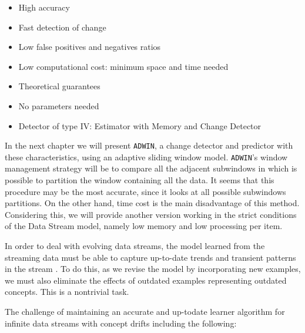 \begin{itemize}
\item High accuracy
\item Fast detection of change
\item Low false positives and negatives ratios 
\item Low computational cost: minimum space and time needed
\item Theoretical guarantees 
\item No parameters needed
\item Detector of type IV: Estimator with Memory and Change Detector
\end{itemize}

In the next chapter we will present %
{\tt ADWIN}, %
a change detector and predictor 
with these characteristics, using an adaptive sliding window model.  %
{\tt ADWIN}'s window management strategy will be to compare all the adjacent subwindows in which is possible to partition the window containing all the data.
It seems that this procedure may be the most accurate, since it looks at all possible subwindows partitions. On the other hand, time cost is the main disadvantage of this method. Considering this, we will provide another version working in the strict conditions of the Data Stream model, namely low
memory and low processing per item.







\BEGINOMIT
In order to deal with evolving data streams,
the model learned
from the streaming data must be able to capture up-to-date trends
and transient patterns in the stream \cite{tsymbal-problem,wang03mining}. To do this, as we revise the
model by incorporating new examples, we must also eliminate the
effects of outdated examples representing outdated concepts. This is a nontrivial
task. 

The challenge of maintaining an accurate and up-todate learner algorithm %
 for infinite data streams with concept drifts including
the following:

